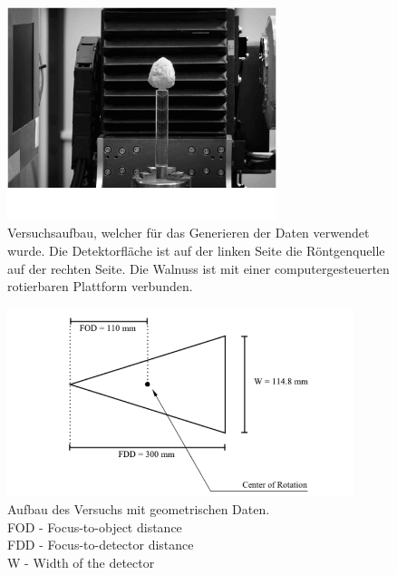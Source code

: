 \documentclass[]{dsadokumentation}
\begin{document}
\begin{figure}
    \centering
    \includegraphics[width=0.7\textwidth]{k4.2/ctabbild.png}
    \caption{Versuchsaufbau, welcher für das Generieren der Daten verwendet wurde. Die Detektorfläche ist auf der linken Seite die Röntgenquelle auf der rechten Seite. Die Walnuss ist mit einer computergesteuerten rotierbaren Plattform verbunden.}
    \label{k4.2.fig.ctAbbild}
\end{figure}
\begin{figure}
    \centering
    \includegraphics[width=0.9\textwidth]{k4.2/geometry.png}
    \caption{Aufbau des Versuchs mit geometrischen Daten.\\
    FOD - Focus-to-object distance\\
    FDD - Focus-to-detector distance\\
    W - Width of the detector
    }
    \label{k4.2.fig.Geo}
\end{figure}
\end{document}
